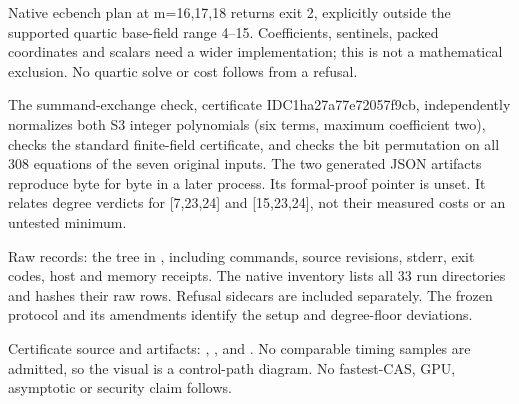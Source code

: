 \documentclass[10pt]{article}
\begin{document}
Native ecbench plan at m=16,17,18 returns exit 2, explicitly outside the
supported quartic base-field range 4--15. Coefficients, sentinels, packed
coordinates and scalars need a wider implementation; this is not a
mathematical exclusion. No quartic solve or cost follows from a refusal.

The summand-exchange check, certificate IDC1ha27a77e72057f9cb, independently
normalizes both S3 integer polynomials (six terms, maximum coefficient two),
checks the standard finite-field certificate, and checks the bit permutation
on all 308 equations of the seven original inputs. The two generated JSON
artifacts reproduce byte for byte in a later process. Its formal-proof
pointer is unset. It relates degree verdicts for [7,23,24] and [15,23,24],
not their measured costs or an untested minimum.

Raw records: the  tree in
, including commands,
source revisions, stderr, exit codes, host and memory receipts. The native
inventory lists all 33 run directories and hashes their raw rows. Refusal
sidecars are included separately. The frozen protocol and its amendments
identify the setup and degree-floor deviations.

Certificate source and artifacts: ,
, and
.
No comparable timing samples are admitted, so the visual is a control-path
diagram. No fastest-CAS, GPU, asymptotic or security claim follows.
\end{document}
